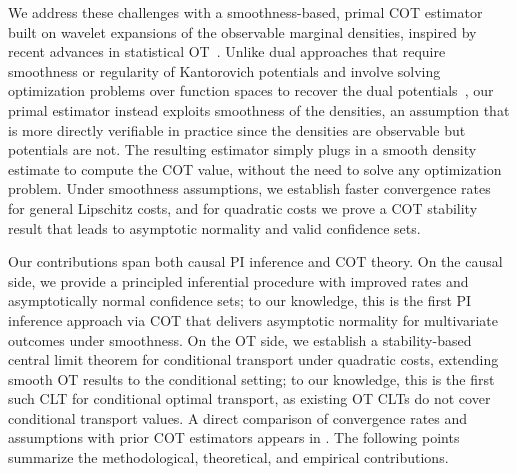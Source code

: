 \documentclass{article}
\theoremstyle{plain}
\theoremstyle{definition}
\theoremstyle{plain}
\begin{document}
We address these challenges with a smoothness-based, primal COT estimator built on wavelet expansions of the observable marginal densities, inspired by recent advances in statistical OT~\parencite{HutterRigollet2021MinimaxOT,niles2022minimax,manole2024plugin}. 
Unlike dual approaches that require smoothness or regularity of Kantorovich potentials and involve solving optimization problems over function spaces to recover the dual potentials~\parencite{ji2023model,al2025error}, our primal estimator instead exploits smoothness of the densities, an assumption that is more directly verifiable in practice since the densities are observable but potentials are not. 
The resulting estimator simply plugs in a smooth density estimate to compute the COT value, without the need to solve any optimization problem.
Under smoothness assumptions, we establish faster convergence rates for general Lipschitz costs, and for quadratic costs we prove a COT stability result that leads to asymptotic normality and valid confidence sets.

Our contributions span both causal PI inference and COT theory. On the causal side, we provide a principled inferential procedure with improved rates and asymptotically normal confidence sets; to our knowledge, this is the first PI inference approach via COT that delivers asymptotic normality for multivariate outcomes under smoothness. 
On the OT side, we establish a stability-based central limit theorem for conditional transport under quadratic costs, extending smooth OT results to the conditional setting; to our knowledge, this is the first such CLT for conditional optimal transport, as existing OT CLTs do not cover conditional transport values. 
A direct comparison of convergence rates and assumptions with prior COT estimators appears in . 
The following points summarize the methodological, theoretical, and empirical contributions.

\end{document}
